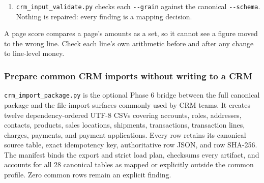 \documentclass[
]{article}
\begin{document}
\begin{enumerate}
  each line's product by its manufacturer's own rule and
  \texttt{-\/-out-products} writes one product per manufacturer and
  code; \texttt{-\/-extractor-raw} checks each code against the row the
  line's own amounts are printed on. An inferred party carries the
  master's key in
  \texttt{<column>\_\allowbreak{}\_\allowbreak{}inferred\_\allowbreak{}party\_\allowbreak{}key},
  and
  \texttt{same\_\allowbreak{}key\_\allowbreak{}on\_\allowbreak{}other\_\allowbreak{}lines}
  fills a line's customer or dealer from the same maker's lines printing
  its order, job, project or transaction number, where every such line
  names one party. It is scored first on held-out lines, and a field
  under 95\% fills nothing.
\item
  \texttt{crm\_\allowbreak{}input\_\allowbreak{}validate.py} checks each
  \texttt{-\/-grain} against the canonical \texttt{-\/-schema}. Nothing
  is repaired: every finding is a mapping decision.
\end{enumerate}

A page score compares a page's amounts as a set, so it cannot see a
figure moved to the wrong line. Check each line's own arithmetic before
and after any change to line-level money.

\subsubsection{Prepare common CRM imports without writing to a
CRM}\label{prepare-common-crm-imports-without-writing-to-a-crm}

\texttt{crm\_\allowbreak{}import\_\allowbreak{}package.py} is the
optional Phase 6 bridge between the full canonical package and the
file-import surfaces commonly used by CRM teams. It creates twelve
dependency-ordered UTF-8 CSVs covering accounts, roles, addresses,
contacts, products, sales locations, shipments, transactions,
transaction lines, charges, payments, and payment applications. Every
row retains its canonical source table, exact idempotency key,
authoritative row JSON, and row SHA-256. The manifest binds the export
and strict load plan, checksums every artifact, and accounts for all 28
canonical tables as mapped or explicitly outside the common profile.
Zero common rows remain an explicit finding.
\end{document}
